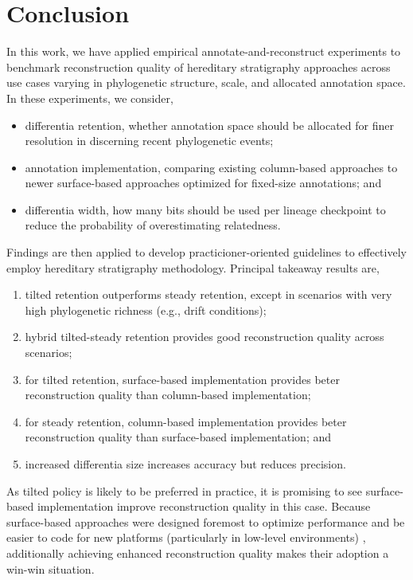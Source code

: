 \section{Conclusion} \label{sec:conclusion}

In this work, we have applied empirical annotate-and-reconstruct experiments to benchmark reconstruction quality of hereditary stratigraphy approaches across use cases varying in phylogenetic structure, scale, and allocated annotation space.
In these experiments, we consider,
\begin{itemize}
\item differentia retention, whether annotation space should be allocated for finer resolution in discerning recent phylogenetic events;
\item annotation implementation, comparing existing column-based approaches to newer surface-based approaches optimized for fixed-size annotations; and
\item differentia width, how many bits should be used per lineage checkpoint to reduce the probability of overestimating relatedness.
\end{itemize}

Findings are then applied to develop practicioner-oriented guidelines to effectively employ hereditary stratigraphy methodology.
Principal takeaway results are,
\begin{enumerate}
\item tilted retention outperforms steady retention, except in scenarios with very high phylogenetic richness (e.g., drift conditions);
\item hybrid tilted-steady retention provides good reconstruction quality across scenarios;
\item for tilted retention, surface-based implementation provides beter reconstruction quality than column-based implementation;
\item for steady retention, column-based implementation provides beter reconstruction quality than surface-based implementation; and
\item increased differentia size increases accuracy but reduces precision.
\end{enumerate}
As tilted policy is likely to be preferred in practice, it is promising to see surface-based implementation improve reconstruction quality in this case.
Because surface-based approaches were designed foremost to optimize performance and be easier to code for new platforms (particularly in low-level environments) \citep{moreno2024trackable}, additionally achieving enhanced reconstruction quality makes their adoption a win-win situation.

